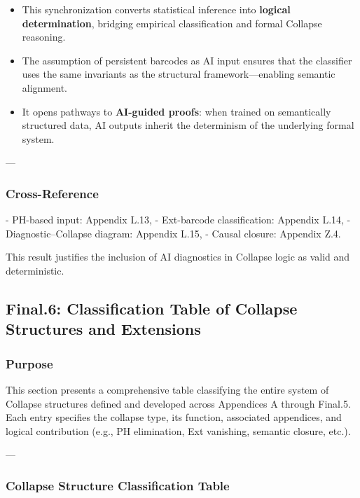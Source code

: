 \documentclass[11pt]{article}
\begin{document}
\begin{axiom}
\begin{axiom}
{{\begin{itemize}
  \item This synchronization converts statistical inference into \textbf{logical determination},  
  bridging empirical classification and formal Collapse reasoning.
  \item The assumption of persistent barcodes as AI input ensures that the classifier uses the same invariants  
  as the structural framework—enabling semantic alignment.
  \item It opens pathways to \textbf{AI-guided proofs}: when trained on semantically structured data,  
  AI outputs inherit the determinism of the underlying formal system.
\end{itemize}

---

\subsubsection*{Cross-Reference}

- PH-based input: Appendix L.13,
- Ext-barcode classification: Appendix L.14,
- Diagnostic–Collapse diagram: Appendix L.15,
- Causal closure: Appendix Z.4.

This result justifies the inclusion of AI diagnostics in Collapse logic as valid and deterministic.


\subsection*{Final.6: Classification Table of Collapse Structures and Extensions}

\subsubsection*{Purpose}

This section presents a comprehensive table classifying  
the entire system of Collapse structures defined and developed  
across Appendices A through Final.5.  
Each entry specifies the collapse type, its function, associated appendices,  
and logical contribution (e.g., PH elimination, Ext vanishing, semantic closure, etc.).

---

\subsubsection*{Collapse Structure Classification Table}

}}
\end{axiom}
\end{axiom}
\end{document}
